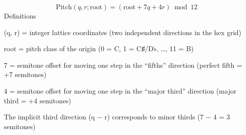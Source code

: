 \[
\text{Pitch}(q, r; \text{root}) = (\text{root} + 7q + 4r) \bmod 12
\]
Definitions

(q, r) = integer lattice coordinates (two independent directions in the hex grid)

root = pitch class of the origin (0 = C, 1 = C♯/D♭, …, 11 = B)

7 = semitone offset for moving one step in the “fifths” direction (perfect fifth = +7 semitones)

4 = semitone offset for moving one step in the “major third” direction (major third = +4 semitones)

The implicit third direction (q − r) corresponds to minor thirds (7 − 4 = 3 semitones)
